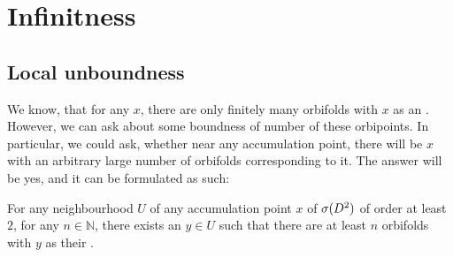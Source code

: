 






\section{Infinitness}\label{infiniteness}
\subsection{Local unboundness}
We know, that for any $x$, there are only finitely many orbifolds with $x$ as an \Eoc . 
However, we can ask about some boundness of number of these orbipoints. 
In particular, we could ask, whether near any accumulation point, there will be $x$ with an 
arbitrary large number of orbifolds corresponding to it. 
The answer will be yes, and it can be formulated as such:
\begin{theorem}\label{unboundness}
For any neighbourhood $U$ of any accumulation point $x$ of ${{\sigma}(D^2)}$ of order at least $2$, for any 
$n\in \mathbb{N}$, 
there exists an $y\in U$ such that there are at least $n$ orbifolds with $y$ as their 
\Eoc. 
\end{theorem}
